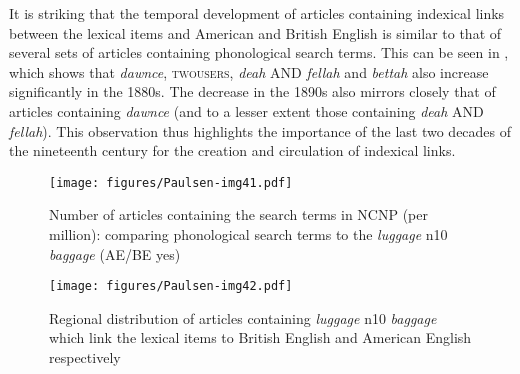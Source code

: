 It is striking that the temporal development of articles containing indexical links between the lexical items and American and British English is similar to that of several sets of articles containing phonological search terms. This can be seen in , which shows that \emph{dawnce}, \textsc{twousers,} \emph{deah} AND \emph{fellah} and \emph{bettah} also increase significantly in the 1880s. The decrease in the 1890s also mirrors closely that of articles containing \emph{dawnce} (and to a lesser extent those containing \emph{deah} AND \emph{fellah}). This observation thus highlights the importance of the last two decades of the nineteenth century for the creation and circulation of indexical links.


\begin{figure}
\texttt{[image: figures/Paulsen-img41.pdf]}
\caption{
Number of articles containing the search terms in NCNP (per million): comparing phonological search terms to the \emph{luggage} n10 \emph{baggage} (AE/BE yes)
}
\label{fig:key:41}
\end{figure}



\begin{figure}
\texttt{[image: figures/Paulsen-img42.pdf]}
\caption{
Regional distribution of articles containing \emph{luggage} n10 \emph{baggage} which link the lexical items to British English and American English respectively
}
\label{fig:key:42}
\end{figure}

